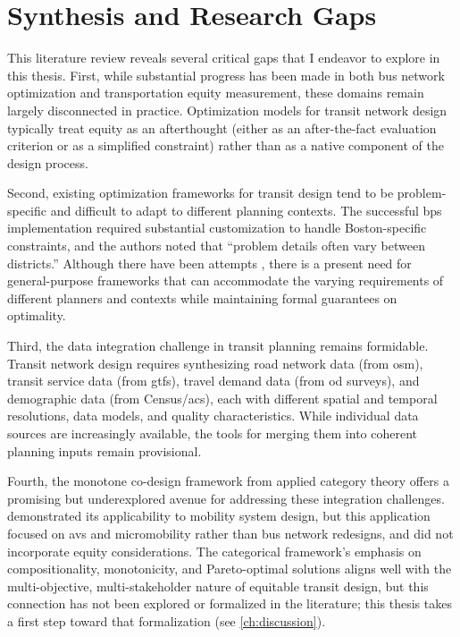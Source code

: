\section{Synthesis and Research Gaps}

This literature review reveals several critical gaps that I endeavor to explore in this thesis. First, while substantial progress has been made in both bus network optimization and transportation equity measurement, these domains remain largely disconnected in practice. Optimization models for transit network design typically treat equity as an afterthought (either as an after-the-fact evaluation criterion or as a simplified constraint) rather than as a native component of the design process.

Second, existing optimization frameworks for transit design tend to be problem-specific and difficult to adapt to different planning contexts. The successful \gls{bps} implementation required substantial customization to handle Boston-specific constraints, and the authors noted that ``problem details often vary between districts.'' Although there have been attempts \cite{AzaveaBusplan2026}, there is a present need for general-purpose frameworks that can accommodate the varying requirements of different planners and contexts while maintaining formal guarantees on optimality.

Third, the data integration challenge in transit planning remains formidable. Transit network design requires synthesizing road network data (from \gls{osm}), transit service data (from \gls{gtfs}), travel demand data (from \gls{od} surveys), and demographic data (from Census/\gls{acs}), each with different spatial and temporal resolutions, data models, and quality characteristics. While individual data sources are increasingly available, the tools for merging them into coherent planning inputs remain provisional.

Fourth, the monotone co-design framework from applied category theory offers a promising but underexplored avenue for addressing these integration challenges. \textcite{zardiniCoDesignEnableUserFriendly2023} demonstrated its applicability to mobility system design, but this application focused on \glspl{av} and micromobility rather than bus network redesigns, and did not incorporate equity considerations. The categorical framework's emphasis on compositionality, monotonicity, and Pareto-optimal solutions aligns well with the multi-objective, multi-stakeholder nature of equitable transit design, but this connection has not been explored or formalized in the literature; this thesis takes a first step toward that formalization (see \autoref{ch:discussion}).

